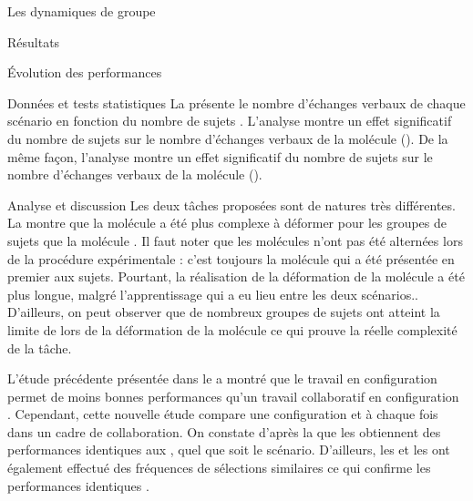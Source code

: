 \documentclass[myfrancais]{mythesis}
\begin{document}
\begin{mychapter}{Les dynamiques de groupe}
\begin{mysection}{Résultats}
\begin{mysubsection}{Évolution des performances}
\begin{mysubsubsection}{Données et tests statistiques}
					La  présente le nombre d'échanges verbaux  de chaque scénario  en fonction du nombre de sujets .
					L'analyse montre un effet significatif du nombre de sujets  sur le nombre d'échanges verbaux  de la molécule \myPrion ().
					De la même façon, l'analyse montre un effet significatif du nombre de sujets  sur le nombre d'échanges verbaux  de la molécule \myUbiquitin ().
				\end{mysubsubsection}
				\begin{mysubsubsection}{Analyse et discussion}
					Les deux tâches proposées sont de natures très différentes.
					La  montre que la molécule \myUbiquitin a été plus complexe à déformer pour les groupes de sujets que la molécule \myPrion.
					Il faut noter que les molécules n'ont pas été alternées lors de la procédure expérimentale  : c'est toujours la molécule \myPrion qui a été présentée en premier aux sujets.
					Pourtant, la réalisation de la déformation de la molécule \myUbiquitin a été plus longue, malgré l'apprentissage qui a eu lieu entre les deux scénarios..
					D'ailleurs, on peut observer que de nombreux groupes de sujets ont atteint la limite de  lors de la déformation de la molécule \myUbiquitin ce qui prouve la réelle complexité de la tâche.

					L'étude précédente présentée dans le  a montré que le travail en configuration  permet de moins bonnes performances qu'un travail collaboratif en configuration .
					Cependant, cette nouvelle étude compare une configuration  et  à chaque fois dans un cadre de collaboration.
					On constate d'après la  que les  obtiennent des performances identiques aux , quel que soit le scénario.
					D'ailleurs, les  et les  ont également effectué des fréquences de sélections similaires ce qui confirme les performances identiques .


\end{mysubsubsection}
\end{mysubsection}
\end{mysection}
\end{mychapter}
\end{document}
